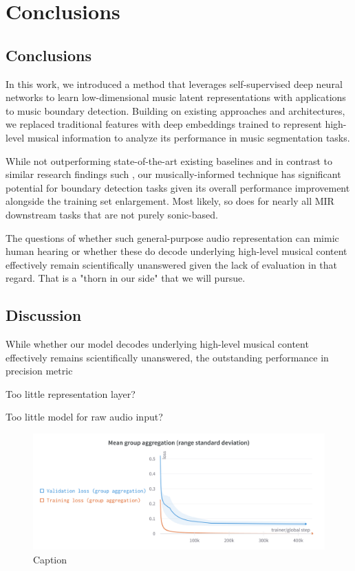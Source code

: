 \chapter{Conclusions}

\section{Conclusions}

In this work, we introduced a method that leverages self-supervised deep neural networks to learn low-dimensional music latent representations with applications to music boundary detection. Building on existing approaches and architectures, we replaced traditional features with deep embeddings trained to represent high-level musical information to analyze its performance in music segmentation tasks.

While not outperforming state-of-the-art existing baselines and in contrast to similar research findings such \cite{deepfeaturesegment, SalamonDeepSegmentation}, our musically-informed technique has significant potential for boundary detection tasks given its overall performance improvement alongside the training set enlargement. Most likely, so does for nearly all MIR downstream tasks that are not purely sonic-based.

The questions of whether such general-purpose audio representation can mimic human hearing \cite{Li2023MERT:Training, Turian2022HEAR:Representations} or whether these do decode underlying high-level musical content effectively remain scientifically unanswered given the lack of evaluation in that regard. That is a "thorn in our side" that we will pursue.

\section{Discussion}

While whether our model decodes underlying high-level musical content effectively remains scientifically unanswered, the outstanding performance in precision metric

Too little representation layer?

Too little model for raw audio input? \cite{verydeep}

\begin{figure}
    \centering
    \includegraphics[width=\textwidth]{figures/images/Mean group aggregation.png}
    \caption{Caption}
    \label{fig:enter-label}
\end{figure}



\newpage


